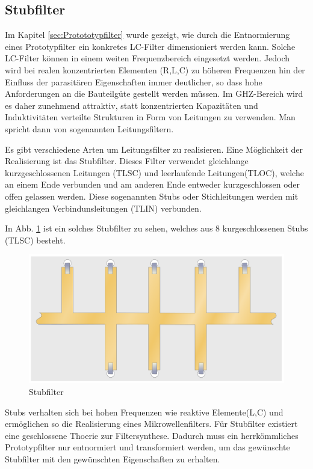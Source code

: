 \subsection{Stubfilter}

Im Kapitel \ref{sec:Protototypfilter} wurde gezeigt, wie durch die Entnormierung eines Prototypfilter ein konkretes LC-Filter dimensioniert werden kann. Solche LC-Filter  können in einem weiten Frequenzbereich  eingesetzt  werden.  Jedoch
wird  bei realen konzentrierten Elementen (R,L,C) zu höheren Frequenzen hin der Einfluss der parasitären Eigenschaften immer deutlicher, so dass hohe Anforderungen an die Bauteilgüte  gestellt  werden  müssen. Im GHZ-Bereich wird es daher  zunehmend attraktiv,  statt  konzentrierten  Kapazitäten  und  Induktivitäten  verteilte
Strukturen  in  Form  von  Leitungen  zu  verwenden.  Man  spricht   dann  von sogenannten Leitungsfiltern.

\cite[p.~203]{ref:gustrau}

Es gibt verschiedene Arten um  Leitungsfilter zu realisieren. Eine Möglichkeit der  Realisierung  ist das Stubfilter.  Dieses  Filter  verwendet  gleichlange kurzgeschlossenen Leitungen (TLSC) und  leerlaufende  Leitungen(TLOC), welche an einem Ende verbunden und am anderen Ende entweder kurzgeschlossen
oder offen gelassen werden. Diese sogenannten Stubs oder Stichleitungen werden mit gleichlangen Verbindunsleitungen (TLIN) verbunden. 

In Abb. \ref{fig:Stubfilter} ist ein solches Stubfilter zu sehen, welches aus 8 kurgeschlossenen Stubs (TLSC) besteht.

\begin{figure}[h!]
\centering
 	\includegraphics[width=\imagewidth]{images/Stripline_Stub_Filter}
 	\caption{Stubfilter}
 	\label{fig:Stubfilter}
\end{figure}

\cite{ref:wikipedia:stripline}

Stubs verhalten sich bei  hohen  Frequenzen  wie  reaktive Elemente(L,C) und ermöglichen so die Realisierung  eines  Mikrowellenfilters. Für Stubfilter existiert eine geschlossene Thoerie zur Filtersynthese. Dadurch muss ein herrkömmliches Prototypfilter nur entnormiert und transformiert werden, um das gewünschte Stubfilter mit den gewünschten Eigenschaften zu erhalten.

